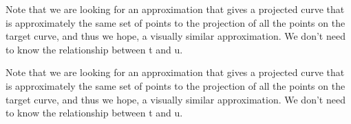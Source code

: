 \documentclass{article}
\begin{document}
\begin{Maple Normal}{
\begin{Maple Normal}{
\textit{}}\end{Maple Normal}
}\end{Maple Normal}
\begin{Maple Normal}{
\begin{Maple Normal}{
\textit{}}\end{Maple Normal}
}\end{Maple Normal}
\begin{Maple Normal}{
\begin{Maple Normal}{
Note that we are looking for an approximation that gives a  projected curve that is approximately the same set of points to the projection of all the points on the target curve, and thus we hope, a visually similar approximation. We don't need to know the relationship between t and u.}\end{Maple Normal}
\begin{Maple Normal}{
Note that we are looking for an approximation that gives a  projected curve that is approximately the same set of points to the projection of all the points on the target curve, and thus we hope, a visually similar approximation. We don't need to know the relationship between t and u.}\end{Maple Normal}
}\end{Maple Normal}
\begin{Maple Normal}{
\begin{Maple Normal}{
}\end{Maple Normal}
}\end{Maple Normal}
\begin{Maple Normal}{
\begin{Maple Normal}{
}\end{Maple Normal}
}\end{Maple Normal}
\begin{Maple Normal}{
\begin{Maple Normal}{
}\end{Maple Normal}
}\end{Maple Normal}
\begin{Maple Normal}{
\begin{Maple Normal}{
}\end{Maple Normal}
}\end{Maple Normal}
\end{document}
